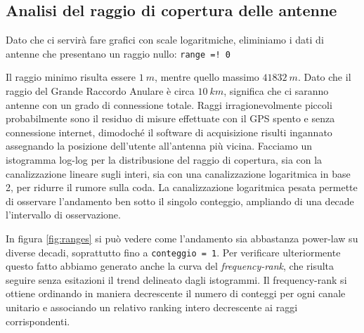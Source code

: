 \subsection{Analisi del raggio di copertura delle antenne}
Dato che ci servirà fare grafici con scale logaritmiche, eliminiamo i dati di antenne che presentano un raggio nullo: \lstinline{range =! 0}

Il raggio minimo risulta essere $1\:m$, mentre quello massimo $41832\:m$. Dato che il raggio del Grande Raccordo Anulare è circa $10\:km$, significa che ci saranno antenne con un grado di connessione totale. Raggi irragionevolmente piccoli probabilmente sono il residuo di misure effettuate con il GPS spento e senza connessione internet, dimodoché il software di acquisizione risulti ingannato assegnando la posizione dell'utente all'antenna più vicina.
Facciamo un istogramma log-log per la distribusione del raggio di copertura, sia con la canalizzazione lineare sugli interi, sia con una canalizzazione logaritmica in base 2, per ridurre il rumore sulla coda. La canalizzazione logaritmica pesata permette di osservare l'andamento ben sotto il singolo conteggio, ampliando di una decade l'intervallo di osservazione.

In figura \ref{fig:ranges} si può vedere come l'andamento sia abbastanza power-law su diverse decadi, soprattutto fino a \lstinline{conteggio = 1}. Per verificare ulteriormente questo fatto abbiamo generato anche la curva del \emph{frequency-rank}, che risulta seguire senza esitazioni il trend delineato dagli istogrammi.
Il frequency-rank si ottiene ordinando in maniera decrescente il numero di conteggi per ogni canale unitario e associando un relativo ranking intero decrescente ai raggi corrispondenti. 
 
